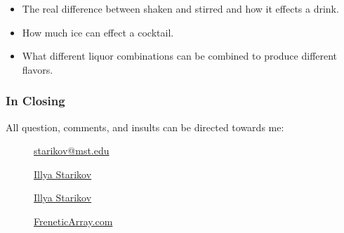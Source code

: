\documentclass[xclolor=dvipsnames]{beamer}            %
\begin{document}
\begin{darkframes}
\begin{frame}
        \begin{itemize}
            \item The real difference between shaken and stirred and how it effects a drink.
            \item How much ice can effect a cocktail.
            \item What different liquor combinations can be combined to produce different flavors.
        \end{itemize}

    \end{frame}

    \begin{frame}
        \frametitle{In Closing}

        All question, comments, and insults can be directed towards me:

        \begin{center}
            \begin{description}
                \item[\faComment] \href{mailto:starikov@mst.edu}{starikov@mst.edu}
                \item[\faLinkedin] \href{https://www.linkedin.com/in/illyastarikov/}{Illya Starikov}
                \item[\faGithub] \href{https://github.com/IllyaStarikov/}{Illya Starikov}
                \item[\faRss] \href{https://freneticarray.com/}{FreneticArray.com}
            \end{description}
        \end{center}
    \end{frame}
\end{darkframes}
\end{document}
